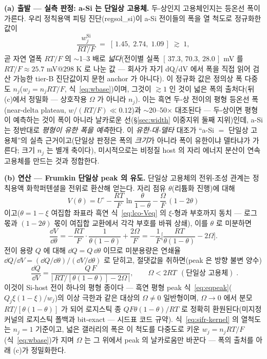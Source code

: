 \textbf{(a) 출발 --- 실측 판정: a-Si 는 단일상 고용체.} 두-상인지 고용체인지는 등온선 폭이 가른다. 우리 정칙용액
피팅 진단(regsol\_si)이 a-Si 전이들의 폭을 열 척도로 정규화한 값이
\begin{equation}
\frac{w_j^{\mathrm{Si}}}{RT/F}\;=\;[\,1.45,\;2.74,\;1.09\,]\;\gtrsim\;1,
\label{eq:sifr-width}
\end{equation}
곧 자연 열폭 $RT/F$ 의 $\sim$1--3 배로 \emph{넓다}(전이별 실폭 $[\,37.3,\,70.3,\,28.0\,]$ mV 를
$RT/F\!\approx\!25.7$ mV$@298$ K 로 나눈 값 --- 회사가 자기 dQ/dV 에서 폭을 직접 읽어 검산 가능한
tier-B 진단값이지 문헌 anchor 가 아니다). 이 정규화 값은 정의상 폭 다중도 $n_j$($w_j{=}n_jRT/F$,
식~\eqref{eq:wbase})이며, 그것이 $\gtrsim1$ 인 것이 넓은 폭의 출처다(뒤 (c)에서 정밀화 --- 상호작용 $\Omega$ 가
아니라 $n_j$). 이는 흑연 두-상 전이의 평형 등온선 폭(near-delta plateau, $w/(RT/F)\!\ll\!0.12$)과 $\sim$20--50$\times$
대조된다 --- 두-상이면 평형이 예측하는 것이 폭이 아니라 날카로운 선(\S\ref{sec:width} 이중지위 둘째 지위)인데,
a-Si 는 정반대로 \emph{평형이 유한 폭을 예측}한다. 이 \emph{유한-대-델타} 대조가 ``a-Si $=$ 단일상 고용체''의
실측 근거이고(단일상 판정은 폭의 \emph{크기}가 아니라 폭이 유한이냐 델타냐가 가른다; 크기 $n_j$ 는 별개 축이다),
미시적으로는 비정질 host 의 자리 에너지 분산이 연속 고용체를 만드는 것과 정합한다\cite{chevrier_dahn2009,artrith2018}.

\textbf{(b) 연산 --- Frumkin 단일상 peak 의 유도.} 단일상 고용체의 전위-조성 관계는 정칙용액 화학퍼텐셜을 전위로
환산해 얻는다. 자리 점유 $\theta$(리튬화 진행)에 대해
\begin{equation}
V(\theta)=U^\circ-\frac{RT}{F}\ln\frac{\theta}{1-\theta}-\frac{\Omega}{F}\,(1-2\theta)
\label{eq:sifr-V}
\end{equation}
이고($\theta{=}1{-}\xi$ 여집합 좌표라 흑연 식~\eqref{eq:lco-Veq} 의 $\xi$-형과 부호까지 동치 --- 로그 몫과
$(1-2\theta)$ 몫이 여집합 교환에서 각각 부호를 바꿔 상쇄), 이를 $\theta$ 로 미분하면
\begin{equation}
\frac{\dd V}{\dd\theta}=-\frac{RT}{F}\cdot\frac{1}{\theta(1-\theta)}+\frac{2\Omega}{F}
=-\frac{1}{F}\Big[\frac{RT}{\theta(1-\theta)}-2\Omega\Big].
\label{eq:sifr-dVdtheta}
\end{equation}
전이 용량 $Q$ 에 대해 $\dd Q=Q\,\dd\theta$ 이므로 미분용량은 연쇄율 $\dd Q/\dd V=(\dd Q/\dd\theta)/(\dd V/\dd\theta)$
로 닫히고, 절댓값을 취하면(peak 은 방향 불변 양수)
\begin{equation}
\boxed{\;\frac{\dd Q}{\dd V}=\frac{Q\,F}{\big|\,RT/[\theta(1-\theta)]-2\Omega\,\big|},
\qquad \Omega<2RT\ \ (\text{단일상 고용체})\;.}
\label{eq:sifr-kernel}
\end{equation}
이것이 Si-host 전이 하나의 평형 종이다 --- 흑연 평형 peak 식~\eqref{eq:eqpeak}($Q_j\xi(1-\xi)/w_j$)의 이상 극한과
같은 대상의 $\Omega\ne0$ 일반형이며, $\Omega{\to}0$ 에서 분모 $RT/[\theta(1-\theta)]$ 가 되어 로지스틱 종
$QF\theta(1-\theta)/RT$ 로 정확히 환원된다(미지정 커널의 로지스틱 폴백과 bit-exact --- 시드표 코드 규약).
식~\eqref{eq:sifr-kernel} 의 열척도는 $n_j{=}1$ 기준이고, 넓은 갤러리의 폭은 이 척도를 다중도로 키운
$w_j{=}n_jRT/F$(식~\eqref{eq:wbase})가 지며 $\Omega$ 는 그 위에서 peak 의 날카로움만 바꾼다 --- 폭의 출처를
아래 (c)가 정밀화한다.

